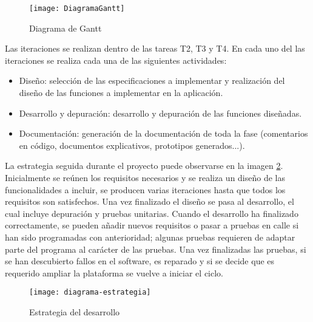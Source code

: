 \begin{figure}[t]
	 {
		\texttt{[image: DiagramaGantt]}
	}
	\caption{Diagrama de Gantt}
	\label{fig:gantt}
\end{figure}

Las iteraciones se realizan dentro de las tareas T2, T3 y T4. En cada uno del las iteraciones se realiza cada una de las siguientes actividades:
\begin{itemize}
	\item Diseño: selección de las especificaciones a implementar y realización 	del diseño de las funciones a implementar en la aplicación.

	\item Desarrollo y depuración: desarrollo y depuración de las funciones diseñadas.

	\item Documentación: generación de la documentación de toda la fase (comentarios en código, documentos explicativos, prototipos generados...).
\end{itemize}

La estrategia seguida durante el proyecto puede observarse en la imagen \ref{fig:estrategia}. Inicialmente se reúnen los requisitos necesarios y se realiza un diseño de las funcionalidades a incluir, se producen varias iteraciones hasta que todos los requisitos son satisfechos. Una vez finalizado el diseño se pasa al desarrollo, el cual incluye depuración y pruebas unitarias. Cuando el desarrollo ha finalizado correctamente, se pueden añadir nuevos requisitos o pasar a pruebas en calle si han sido programadas con anterioridad; algunas pruebas requieren de adaptar parte del programa al carácter de las pruebas. Una vez finalizadas las pruebas, si se han descubierto fallos en el software, es reparado y si se decide que es requerido ampliar la plataforma se vuelve a iniciar el ciclo.
\begin{figure}[t]
	\begin{center}
		\texttt{[image: diagrama-estrategia]}
		\caption{Estrategia del desarrollo}
		\label{fig:estrategia}
	\end{center}
\end{figure}
\FloatBarrier
